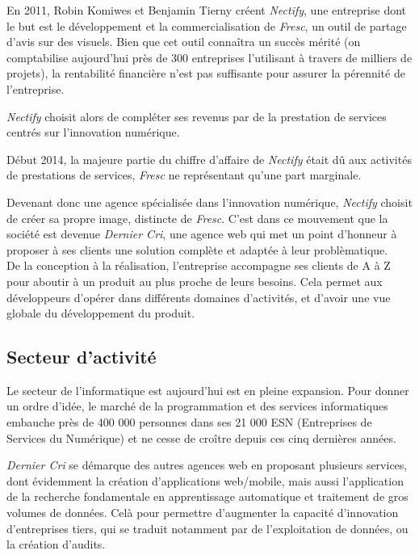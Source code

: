 \bigskip

En 2011, Robin Komiwes et Benjamin Tierny créent \emph{Nectify}, une
entreprise dont le but est le développement et la commercialisation de
\emph{Fresc}, un outil de partage d'avis sur des visuels. Bien que cet
outil connaîtra un succès mérité (on comptabilise aujourd'hui près de
300 entreprises l'utilisant à travers de milliers de projets), la
rentabilité financière n'est pas suffisante pour assurer la pérennité de
l'entreprise.

\bigskip

\emph{Nectify} choisit alors de compléter ses revenus par de la
prestation de services centrés sur l'innovation numérique.

\bigskip

Début 2014, la majeure partie du chiffre d'affaire de \emph{Nectify}
était dû aux activités de prestations de services, \emph{Fresc} ne
représentant qu'une part marginale.

\bigskip

Devenant donc une agence spécialisée dans l'innovation numérique,
\emph{Nectify} choisit de créer sa propre image, distincte de
\emph{Fresc}. C'est dans ce mouvement que la société est devenue
\emph{Dernier Cri}, une agence web qui met un point d'honneur à proposer
à ses clients une solution complète et adaptée à leur problèmatique.\\
De la conception à la réalisation, l'entreprise accompagne ses clients
de A à Z pour aboutir à un produit au plus proche de leurs besoins. Cela
permet aux développeurs d'opérer dans différents domaines d'activités,
et d'avoir une vue globale du développement du produit.

\bigskip

\subsection{Secteur d'activité}\label{secteur-dactivituxe9}

\bigskip

Le secteur de l'informatique est aujourd'hui est en pleine expansion.
Pour donner un ordre d'idée, le marché de la programmation et des
services informatiques embauche près de 400 000 personnes dans ses 21
000 ESN (Entreprises de Services du Numérique) et ne cesse de croître
depuis ces cinq dernières années.

\bigskip

\emph{Dernier Cri} se démarque des autres agences web en proposant
plusieurs services, dont évidemment la création d'applications
web/mobile, mais aussi l'application de la recherche fondamentale en
apprentissage automatique et traitement de gros volumes de données. Celà
pour permettre d'augmenter la capacité d'innovation d'entreprises tiers,
qui se traduit notamment par de l'exploitation de données, ou la
création d'audits.

